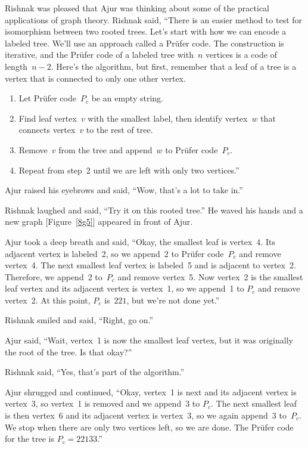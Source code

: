 Rishnak was pleased that Ajur was thinking about some of the practical applications of graph theory. Rishnak said, ``There is an easier method to test for isomorphism between two rooted trees. Let's start with how we can encode a labeled tree. We'll use an approach called a Pr\"ufer code.  The construction is iterative, and the Pr\"ufer code of a labeled tree with~$n$ vertices is a code of length~$n-2$. Here's the algorithm, but first, remember that a leaf of a tree is a vertex that is connected to only one other vertex.

\begin{enumerate}
\item Let Pr{\"u}fer code~$P_c$ be an empty string.

\item Find leaf vertex~$v$ with the smallest label, then identify vertex~$w$ that connects vertex~$v$ to the rest of tree.

\item Remove~$v$ from the tree and append~$w$ to Pr{\"u}fer code~$P_c$.

\item Repeat from step~2 until we are left with only two vertices.''
\end{enumerate}

Ajur raised his eyebrows and said, ``Wow, that's a lot to take in.''

Rishnak laughed and said, ``Try it on this rooted tree.''  He waved his hands and a new graph [Figure~\ref{8g5}] appeared in front of Ajur.

Ajur took a deep breath and said, ``Okay, the smallest leaf is vertex~4. Its adjacent vertex is labeled~2, so we append~2 to Pr\"ufer code~$P_c$ and remove vertex~4. The next smallest leaf vertex is labeled~5 and is adjacent to vertex~2. Therefore, we append~2 to~$P_c$ and remove vertex~5. Now vertex~2 is the smallest leaf vertex and its adjacent vertex is vertex~1, so we append~1 to $P_c$ and remove vertex~2. At this point, $P_c$ is~$221$, but we're not done yet.''

Rishnak smiled and said, ``Right, go on.''

Ajur said, ``Wait, vertex~1 is now the smallest leaf vertex, but it was originally the root of the tree. Is that okay?''

Rishnak said, ``Yes, that's part of the algorithm.''

Ajur shrugged and continued, ``Okay, vertex~1 is next and its adjacent vertex is vertex~3, so vertex~1 is removed and we append~3 to $P_c$. The next smallest leaf is then vertex~6 and its adjacent vertex is vertex~3, so we again append~3 to~$P_c$. We stop when there are only two vertices left, so we are done. The Pr{\"u}fer code for the tree is $P_c=22133$.''

